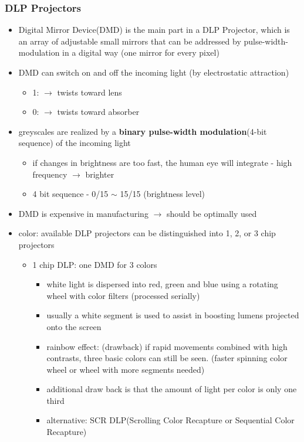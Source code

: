 \documentclass{standalone}
\begin{document}
\subsubsection*{DLP Projectors}
\begin{itemize}
	\item Digital Mirror Device(DMD) is the main part in a DLP Projector, which is an array of adjustable small mirrors that can be addressed by pulse-width-modulation in a digital way (one mirror for every pixel)
	\item DMD can switch on and off the incoming light (by electrostatic attraction)
		\begin{itemize}
			\item 1: $\rightarrow$ twists toward lens
			\item 0: $\rightarrow$ twists toward absorber
		\end{itemize}
	\item greyscales are realized by a \textbf{binary pulse-width modulation}(4-bit sequence) of the incoming light
		\begin{itemize}
			\item if changes in brightness are too fast, the human eye will integrate - high frequency $\rightarrow$ brighter
			\item 4 bit sequence - 0/15 $\sim$ 15/15 (brightness level)
		\end{itemize} 
	\item DMD is expensive in manufacturing $\rightarrow$ should be optimally used
	\item color: available DLP projectors can be distinguished into 1, 2, or 3 chip projectors
		\begin{itemize}
			\item 1 chip DLP: one DMD for 3 colors
			\begin{itemize}
				\item white light is dispersed into red, green and blue using a rotating wheel with color filters (processed serially)
				\item usually a white segment is used to assist in boosting lumens projected onto the screen
				\item rainbow effect: (drawback) if rapid movements combined with high contrasts, three basic colors can still be seen. (faster spinning color wheel or wheel with more segments needed)
				\item additional draw back is that the amount of light per color is only one third
				\item alternative: SCR DLP(Scrolling Color Recapture or Sequential Color Recapture)

\end{itemize}
\end{itemize}
\end{itemize}
\end{document}
